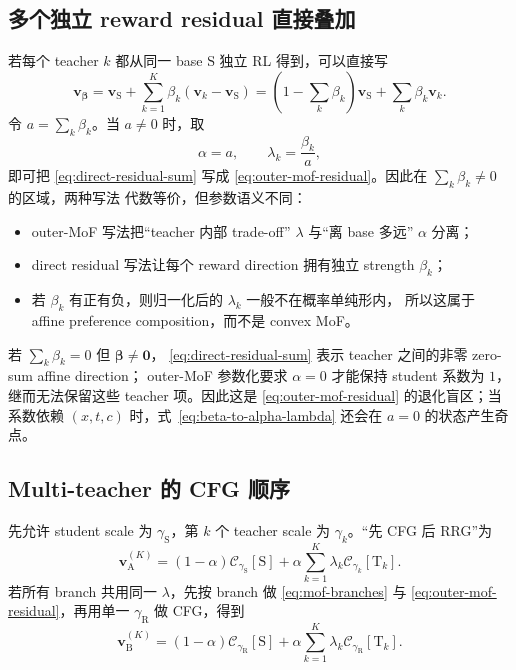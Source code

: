 \documentclass[11pt,a4paper]{article}
\newcommand{\C}{\mathcal{C}}
\newcommand{\vfield}{\bm{v}}
\newcommand{\student}{\mathrm{S}}
\newcommand{\teacher}{\mathrm{T}}
\theoremstyle{definition}
\theoremstyle{plain}
\begin{document}
\subsection{多个独立 reward residual 直接叠加}

若每个 teacher $k$ 都从同一 base $\student$ 独立 RL 得到，可以直接写
\begin{equation}
  \vfield_{\bm\beta}
  =
  \vfield_\student
  +\sum_{k=1}^{K}\beta_k
  (\vfield_k-\vfield_\student)
  =
  \left(1-\sum_k\beta_k\right)\vfield_\student
  +\sum_k\beta_k\vfield_k.
  \label{eq:direct-residual-sum}
\end{equation}
令 $a=\sum_k\beta_k$。当 $a\neq0$ 时，取
\begin{equation}
  \alpha=a,\qquad \lambda_k=\frac{\beta_k}{a},
  \label{eq:beta-to-alpha-lambda}
\end{equation}
即可把 \eqref{eq:direct-residual-sum} 写成
\eqref{eq:outer-mof-residual}。因此在 $\sum_k\beta_k\neq0$ 的区域，两种写法
代数等价，但参数语义不同：
\begin{itemize}[leftmargin=1.6em]
  \item outer-MoF 写法把``teacher 内部 trade-off'' $\lambda$ 与``离 base 多远''
  $\alpha$ 分离；
  \item direct residual 写法让每个 reward direction 拥有独立 strength $\beta_k$；
  \item 若 $\beta_k$ 有正有负，则归一化后的 $\lambda_k$ 一般不在概率单纯形内，
  所以这属于 affine preference composition，而不是 convex MoF。
\end{itemize}
若 $\sum_k\beta_k=0$ 但 $\bm\beta\neq\bm0$，
\eqref{eq:direct-residual-sum} 表示 teacher 之间的非零 zero-sum affine direction；
outer-MoF 参数化要求 $\alpha=0$ 才能保持 student 系数为 $1$，继而无法保留这些
teacher 项。因此这是 \eqref{eq:outer-mof-residual} 的退化盲区；当系数依赖
$(x,t,c)$ 时，式~\eqref{eq:beta-to-alpha-lambda} 还会在 $a=0$ 的状态产生奇点。

\subsection{Multi-teacher 的 CFG 顺序}

先允许 student scale 为 $\gamma_\student$，第 $k$ 个 teacher scale 为
$\gamma_k$。``先 CFG 后 RRG''为
\begin{equation}
  \vfield_{\mathrm A}^{(K)}
  =
  (1-\alpha)\C_{\gamma_\student}[\student]
  +\alpha\sum_{k=1}^{K}\lambda_k\C_{\gamma_k}[\teacher_k].
  \label{eq:multi-order-a}
\end{equation}
若所有 branch 共用同一 $\lambda$，先按 branch 做 \eqref{eq:mof-branches} 与
\eqref{eq:outer-mof-residual}，再用单一 $\gamma_{\mathrm R}$ 做 CFG，得到
\begin{equation}
  \vfield_{\mathrm B}^{(K)}
  =
  (1-\alpha)\C_{\gamma_{\mathrm R}}[\student]
  +\alpha\sum_{k=1}^{K}\lambda_k\C_{\gamma_{\mathrm R}}[\teacher_k].
  \label{eq:multi-order-b}
\end{equation}
\end{document}
